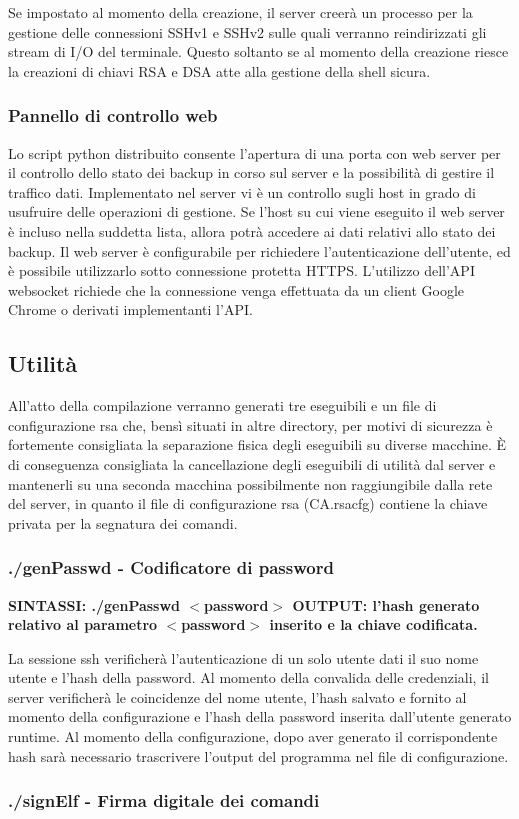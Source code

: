 Se impostato al momento della creazione, il server creerà un processo per la gestione delle connessioni S\+S\+Hv1 e S\+S\+Hv2 sulle quali verranno reindirizzati gli stream di I/O del terminale. Questo soltanto se al momento della creazione riesce la creazioni di chiavi R\+SA e D\+SA atte alla gestione della shell sicura. \subsubsection*{Pannello di controllo web}

Lo script python distribuito consente l’apertura di una porta con web server per il controllo dello stato dei backup in corso sul server e la possibilità di gestire il traffico dati. Implementato nel server vi è un controllo sugli host in grado di usufruire delle operazioni di gestione. Se l’host su cui viene eseguito il web server è incluso nella suddetta lista, allora potrà accedere ai dati relativi allo stato dei backup. Il web server è configurabile per richiedere l’autenticazione dell’utente, ed è possibile utilizzarlo sotto connessione protetta H\+T\+T\+PS. L’utilizzo dell’\+A\+PI websocket richiede che la connessione venga effettuata da un client Google Chrome o derivati implementanti l’\+A\+PI. \subsection*{Utilità}

All’atto della compilazione verranno generati tre eseguibili e un file di configurazione rsa che, bensì situati in altre directory, per motivi di sicurezza è fortemente consigliata la separazione fisica degli eseguibili su diverse macchine. È di conseguenza consigliata la cancellazione degli eseguibili di utilità dal server e mantenerli su una seconda macchina possibilmente non raggiungibile dalla rete del server, in quanto il file di configurazione rsa (C\+A.\+rsacfg) contiene la chiave privata per la segnatura dei comandi.

\subsubsection*{./gen\+Passwd -\/ Codificatore di password}

{\bfseries S\+I\+N\+T\+A\+S\+SI\+: ./gen\+Passwd $<$password$>$ O\+U\+T\+P\+UT\+: l’hash generato relativo al parametro $<$password$>$ inserito e la chiave codificata.}

La sessione ssh verificherà l’autenticazione di un solo utente dati il suo nome utente e l’hash della password. Al momento della convalida delle credenziali, il server verificherà le coincidenze del nome utente, l’hash salvato e fornito al momento della configurazione e l’hash della password inserita dall’utente generato runtime. Al momento della configurazione, dopo aver generato il corrispondente hash sarà necessario trascrivere l’output del programma nel file di configurazione. \subsubsection*{./sign\+Elf -\/ Firma digitale dei comandi}


